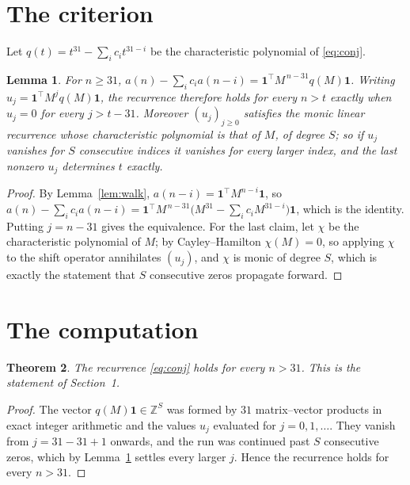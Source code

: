 \documentclass[11pt,a4paper]{article}
\theoremstyle{plain}
\newtheorem{theorem}{Theorem}
\newtheorem{lemma}[theorem]{Lemma}
\theoremstyle{definition}
\begin{document}
\section{The criterion}

Let $q(t)=t^{31}-\sum_i c_i t^{31-i}$ be the characteristic polynomial of
\eqref{eq:conj}.

\begin{lemma}\label{lem:crit}
For $n\ge31$,
$a(n)-\sum_i c_i a(n-i)=\mathbf{1}^{\!\top}M^{\,n-31}q(M)\mathbf{1}$. Writing
$u_j=\mathbf{1}^{\!\top}M^{j}q(M)\mathbf{1}$, the recurrence therefore holds for every
$n>t$ exactly when $u_j=0$ for every $j>t-31$. Moreover $(u_j)_{j\ge0}$ satisfies the
monic linear recurrence whose characteristic polynomial is that of $M$, of degree $S$; so
if $u_j$ vanishes for $S$ consecutive indices it vanishes for every larger index, and the
last nonzero $u_j$ determines $t$ exactly.
\end{lemma}

\begin{proof}
By Lemma~\ref{lem:walk}, $a(n-i)=\mathbf{1}^{\!\top}M^{n-i}\mathbf{1}$, so
$a(n)-\sum_i c_i a(n-i)
=\mathbf{1}^{\!\top}M^{\,n-31}\bigl(M^{31}-\sum_i c_i M^{31-i}\bigr)
\mathbf{1}$, which is the identity. Putting $j=n-31$ gives the equivalence. For the
last claim, let $\chi$ be the characteristic polynomial of $M$; by Cayley--Hamilton
$\chi(M)=0$, so applying $\chi$ to the shift operator annihilates $(u_j)$, and $\chi$ is
monic of degree $S$, which is exactly the statement that $S$ consecutive zeros propagate
forward.
\end{proof}

\section{The computation}

\begin{theorem}
The recurrence \eqref{eq:conj} holds for every $n>31$. This is the statement of
Section~1.
\end{theorem}

\begin{proof}
The vector $q(M)\mathbf{1}\in\mathbb{Z}^{S}$ was formed by $31$ matrix--vector
products in exact integer arithmetic and the values $u_j$ evaluated for
$j=0,1,\dots$. They vanish from $j=31-31+1$ onwards, and the run was continued past
$S$ consecutive zeros, which by Lemma~\ref{lem:crit} settles every larger $j$. Hence the
recurrence holds for every $n>31$.
\end{proof}
\end{document}
